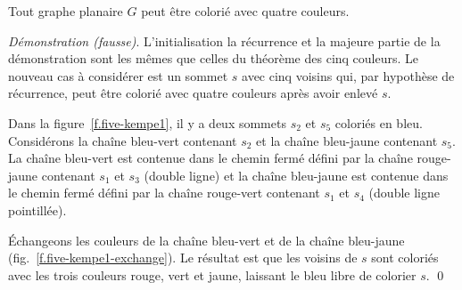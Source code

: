 \begin{theorem}\label{thm.fourcolor}
Tout graphe planaire $G$ peut être colorié avec quatre couleurs.
\end{theorem}

\noindent \emph{Démonstration (fausse)}.  L'initialisation la récurrence et la majeure partie de la démonstration sont les mêmes que celles du théorème des cinq couleurs. Le nouveau cas à considérer est un sommet $s$ avec cinq voisins qui, par hypothèse de récurrence, peut être colorié avec quatre couleurs après avoir enlevé $s$.

Dans la figure~\ref{f.five-kempe1}, il y a deux sommets $s_2$ et $s_5$ coloriés en bleu. Considérons la chaîne bleu-vert contenant $s_2$ et la chaîne bleu-jaune contenant $s_5$. La chaîne bleu-vert est contenue dans le chemin fermé défini par la chaîne rouge-jaune contenant $s_1$ et $s_3$ (double ligne) et la chaîne bleu-jaune est contenue dans le chemin fermé défini par la chaîne rouge-vert contenant $s_1$ et $s_4$ (double ligne pointillée).

Échangeons les couleurs de la chaîne bleu-vert et de la chaîne bleu-jaune (fig.~\ref{f.five-kempe1-exchange}). Le résultat est que les voisins de $s$ sont coloriés avec les trois couleurs rouge, vert et jaune, laissant le bleu libre de colorier $s$. \qed

\vspace{0.4cm}

